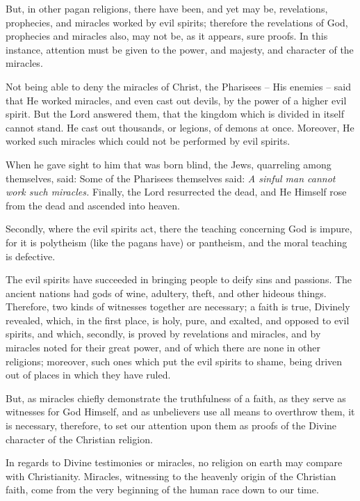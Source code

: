 But, in other pagan religions, there have been, and yet may be, revelations, prophecies, and miracles worked by evil spirits; therefore the revelations of God, prophecies and miracles also, may not be, as it appears, sure proofs. In this instance, attention must be given to the power, and majesty, and character of the miracles.

Not being able to deny the miracles of Christ, the Pharisees -- His enemies -- said that He worked miracles, and even cast out devils, by the power of a higher evil spirit. But the Lord answered them, that the kingdom which is divided in itself cannot stand. He cast out thousands, or legions, of demons at once. Moreover, He worked such miracles which could not be performed by evil spirits.

When he gave sight to him that was born blind, the Jews, quarreling among themselves, said:  Some of the Pharisees themselves said: \textit{A sinful man cannot work such miracles.} Finally, the Lord resurrected the dead, and He Himself rose from the dead and ascended into heaven.

Secondly, where the evil spirits act, there the teaching concerning God is impure, for it is polytheism (like the pagans have) or pantheism, and the moral teaching is defective.

The evil spirits have succeeded in bringing people to deify sins and passions. The ancient nations had gods of wine, adultery, theft, and other hideous things. Therefore, two kinds of witnesses together are necessary; a faith is true, Divinely revealed, which, in the first place, is holy, pure, and exalted, and opposed to evil spirits, and which, secondly, is proved by revelations and miracles, and by miracles noted for their great power, and of which there are none in other religions; moreover, such ones which put the evil spirits to shame, being driven out of places in which they have ruled.

But, as miracles chiefly demonstrate the truthfulness of a faith, as they serve as witnesses for God Himself, and as unbelievers use all means to overthrow them, it is necessary, therefore, to set our attention upon them as proofs of the Divine character of the Christian religion.

In regards to Divine testimonies or miracles, no religion on earth may compare with Christianity. Miracles, witnessing to the heavenly origin of the Christian faith, come from the very beginning of the human race down to our time.

